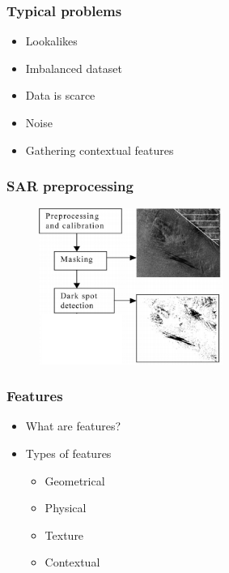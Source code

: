 \documentclass{beamer}
\begin{document}

\begin{frame}
\frametitle{Typical problems}
\begin{itemize}
	\item Lookalikes
	\item Imbalanced dataset
	\item Data is scarce
	\item Noise
	\item Gathering contextual features
	
\end{itemize}
\end{frame}



\begin{frame}
\frametitle{SAR preprocessing}
\begin{figure}
	\centering
    \includegraphics[width=60mm,scale=1]{./img/preprocessing_diagram.png}
\end{figure}
\end{frame}


\begin{frame}
\frametitle{Features}
\begin{itemize}
	\item What are features?
	\item Types of features \begin{itemize}
					\item Geometrical %
					\item Physical %
					\item Texture %
					\item Contextual  %
					\end{itemize}
				
\end{itemize}

\end{frame}
\end{document}
